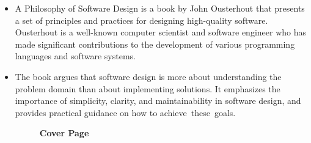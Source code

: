 %
%
%
%




{
  \begin{itemize}
    \item A Philosophy of Software Design is a book by John Ousterhout that presents a set of principles and practices for designing high-quality software. Ousterhout is a well-known computer scientist and software engineer who has made significant contributions to the development of various programming languages and software systems.\newline
  
    \item The book argues that software design is more about understanding the problem domain than about implementing solutions. It emphasizes the importance of simplicity, clarity, and maintainability in software design, and provides practical guidance on how to achieve these goals.
   

\begin{figure}
	\centering
	\caption{\textbf{Cover Page \cite{Ousterhout:2018}}}
	\label{fig:Cover Page}
\end{figure}

  \end{itemize}
}

